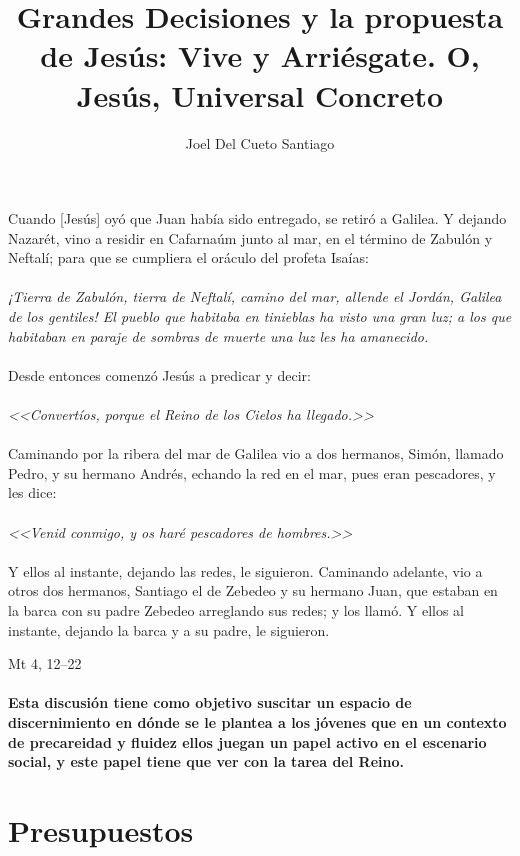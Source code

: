 \documentclass[10pt]{article}
\title{Grandes Decisiones y la propuesta de Jesús: Vive y Arriésgate. O, Jesús,
  Universal Concreto} \author{Joel Del Cueto Santiago} \date{}
\begin{document}
\maketitle

Cuando [Jesús] oyó que Juan había sido entregado, se retiró a Galilea. Y dejando
Nazarét, vino a residir en Cafarnaúm junto al mar, en el término de
Zabulón y Neftalí; para que se cumpliera el oráculo del profeta Isaías:\\\\
\emph{¡Tierra de Zabulón, tierra de Neftalí, camino del mar, allende el Jordán,
  Galilea de los gentiles! El pueblo que habitaba en tinieblas ha visto una gran
  luz; a los que habitaban en paraje de sombras de muerte una luz les ha
  amanecido.}\\\\ Desde entonces comenzó Jesús a predicar y decir:\\\\
\emph{<<Convertíos, porque el Reino de los Cielos ha llegado.>>}\\\\ Caminando
por la ribera del mar de Galilea vio a dos hermanos, Simón, llamado Pedro, y su
hermano Andrés, echando la red en el mar, pues eran pescadores, y les dice:\\\\
\emph{<<Venid conmigo, y os haré pescadores de hombres.>>}\\\\ Y ellos al
instante, dejando las redes, le siguieron. Caminando adelante, vio a otros dos
hermanos, Santiago el de Zebedeo y su hermano Juan, que estaban en la barca con
su padre Zebedeo arreglando sus redes; y los llamó. Y ellos al instante, dejando
la barca y a su padre, le siguieron.
    \begin{flushright}
    Mt 4, 12--22\end
    {flushright}

    \paragraph{Esta discusión tiene como objetivo suscitar un espacio de
      discernimiento en dónde se le plantea a los jóvenes que en un contexto
      de precareidad y fluidez ellos juegan un papel activo en el escenario
      social, y este papel tiene que ver con la tarea del Reino.}

\section{Presupuestos}
\end{document}
